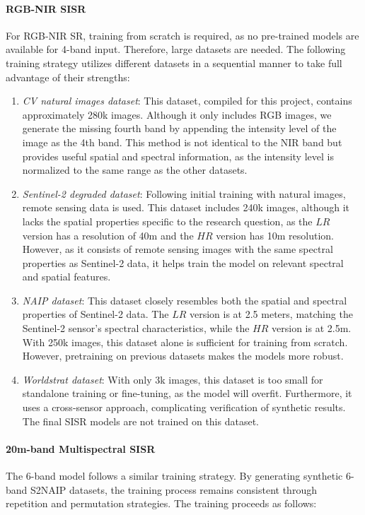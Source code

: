 \paragraph{RGB-NIR SISR}
For RGB-NIR SR, training from scratch is required, as no pre-trained models are available for 4-band input. Therefore, large datasets are needed. The following training strategy utilizes different datasets in a sequential manner to take full advantage of their strengths:

\begin{enumerate}
    \item \textit{CV natural images dataset}: This dataset, compiled for this project, contains approximately 280k images. Although it only includes RGB images, we generate the missing fourth band by appending the intensity level of the image as the 4th band. This method is not identical to the NIR band but provides useful spatial and spectral information, as the intensity level is normalized to the same range as the other datasets.
    \item \textit{Sentinel-2 degraded dataset}: Following initial training with natural images, remote sensing data is used. This dataset includes 240k images, although it lacks the spatial properties specific to the research question, as the $LR$ version has a resolution of 40m and the $HR$ version has 10m resolution. However, as it consists of remote sensing images with the same spectral properties as Sentinel-2 data, it helps train the model on relevant spectral and spatial features.
    \item \textit{NAIP dataset}: This dataset closely resembles both the spatial and spectral properties of Sentinel-2 data. The $LR$ version is at 2.5 meters, matching the Sentinel-2 sensor's spectral characteristics, while the $HR$ version is at 2.5m. With 250k images, this dataset alone is sufficient for training from scratch. However, pretraining on previous datasets makes the models more robust.
    \item \textit{Worldstrat dataset}: With only 3k images, this dataset is too small for standalone training or fine-tuning, as the model will overfit. Furthermore, it uses a cross-sensor approach, complicating verification of synthetic results. The final SISR models are not trained on this dataset.
\end{enumerate}

\paragraph{20m-band Multispectral SISR}
The 6-band model follows a similar training strategy. By generating synthetic 6-band S2NAIP datasets, the training process remains consistent through repetition and permutation strategies. The training proceeds as follows:

